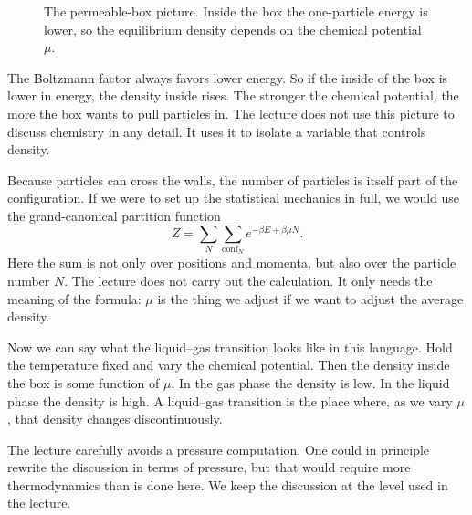 \begin{figure}[t]
\centering
{}
\caption{The permeable-box picture. Inside the box the one-particle energy is lower, so the equilibrium density depends on the chemical potential \(\mu\).}
\end{figure}

The Boltzmann factor always favors lower energy. So if the inside of the box is lower in energy, the density inside rises. The stronger the chemical potential, the more the box wants to pull particles in. The lecture does not use this picture to discuss chemistry in any detail. It uses it to isolate a variable that controls density.

Because particles can cross the walls, the number of particles is itself part of the configuration. If we were to set up the statistical mechanics in full, we would use the grand-canonical partition function
\begin{equation}
Z=\sum_N \sum_{\text{conf}_N} e^{-\beta E+\beta\mu N}.
\end{equation}
Here the sum is not only over positions and momenta, but also over the particle number \(N\). The lecture does not carry out the calculation. It only needs the meaning of the formula: \(\mu\) is the thing we adjust if we want to adjust the average density.

Now we can say what the liquid--gas transition looks like in this language. Hold the temperature fixed and vary the chemical potential. Then the density inside the box is some function of \(\mu\). In the gas phase the density is low. In the liquid phase the density is high. A liquid--gas transition is the place where, as we vary \(\mu\), that density changes discontinuously.

\begin{remark}
The lecture carefully avoids a pressure computation. One could in principle rewrite the discussion in terms of pressure, but that would require more thermodynamics than is done here. We keep the discussion at the level used in the lecture.
\end{remark}

